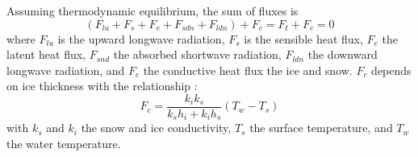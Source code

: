 \documentclass[a4paper,12pt]{article}
\begin{document}
Assuming thermodynamic equilibrium, the sum of fluxes is 
\begin{equation} \label{eq:fluxes}
    (F_{lu}+F_s+F_e+F_{sdn}+F_{ldn})+F_c=F_t+F_c=0
\end{equation}
where $F_{lu}$ is the upward longwave radiation, $F_s$ is the sensible heat flux, $F_e$ the latent heat flux, $F_{snd}$ the absorbed shortwave radiation, $F_{ldn}$ the downward longwave radiation, and $F_c$ the conductive heat flux the ice and snow. $F_c$ depends on ice thickness with the relationship :
\begin{equation} \label{eq:F_c}
    F_c=\frac{k_ik_s}{k_sh_i+k_ih_s} (T_w-T_s) 
\end{equation}
with $k_s$ and $k_i$ the snow and ice conductivity, $T_s$ the surface temperature, and $T_w$ the water temperature.
\end{document}
